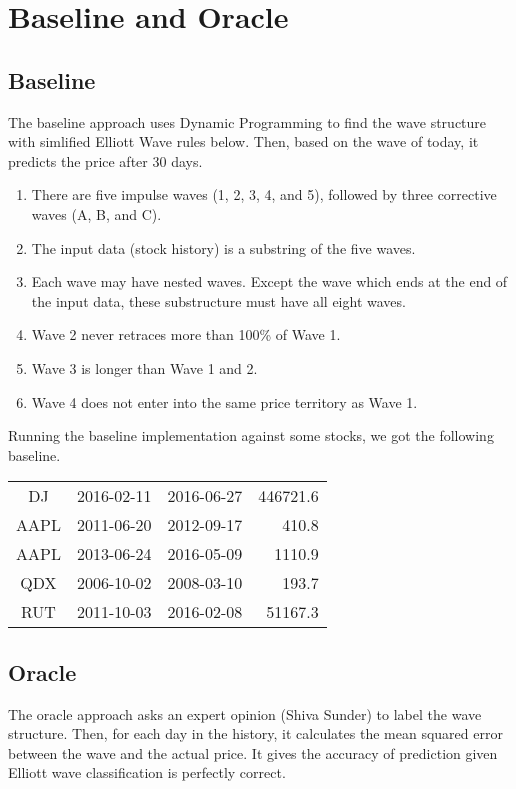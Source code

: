 \documentclass[12pt]{article}
\begin{document}
\section{Baseline and Oracle}

\subsection{Baseline}

The baseline approach uses Dynamic Programming to find the wave
structure with simlified Elliott Wave rules below. Then, based on the
wave of today, it predicts the price after 30 days.

\begin{enumerate}
 \item There are five impulse waves (1, 2, 3, 4, and 5), followed by
   three corrective waves (A, B, and C).
 \item The input data (stock history) is a substring of the five waves.
 \item Each wave may have nested waves. Except the wave which ends at the end of the input data, these substructure must have all eight waves.
 \item Wave 2 never retraces more than 100\% of Wave 1.
 \item Wave 3 is longer than Wave 1 and 2. 
 \item Wave 4 does not enter into the same price territory as Wave 1.
\end{enumerate}

Running the baseline implementation against some stocks, we got the following baseline.

\begin{tabular}{cccr}
DJ & 2016-02-11 & 2016-06-27 & 446721.6  \\
AAPL & 2011-06-20 & 2012-09-17 & 410.8 \\
AAPL & 2013-06-24 & 2016-05-09 & 1110.9 \\
QDX  & 2006-10-02 & 2008-03-10 & 193.7 \\
RUT  & 2011-10-03 & 2016-02-08 & 51167.3 \\
\end{tabular}

\subsection{Oracle}

The oracle approach asks an expert opinion (Shiva Sunder) to label the
wave structure. Then, for each day in the history, it calculates the
mean squared error between the wave and the actual price. It gives the
accuracy of prediction given Elliott wave classification is perfectly
correct.
\end{document}
